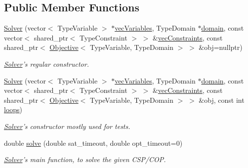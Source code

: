 \subsection*{Public Member Functions}
\begin{DoxyCompactItemize}
\item 
\hyperlink{classghost_1_1Solver_aee74bbdf00494dc209d4909bf9fcb544}{Solver} (vector$<$ Type\-Variable $>$ $\ast$\hyperlink{classghost_1_1Solver_a2d033a454234b2277aabdcc4d89eaba2}{vec\-Variables}, Type\-Domain $\ast$\hyperlink{classghost_1_1Solver_ad9292e9219261ba8058fec05b453c0c9}{domain}, const vector$<$ shared\-\_\-ptr$<$ Type\-Constraint $>$ $>$ \&\hyperlink{classghost_1_1Solver_a170746edcfb777b12978444c2ab3962e}{vec\-Constraints}, const shared\-\_\-ptr$<$ \hyperlink{classghost_1_1Objective}{Objective}$<$ Type\-Variable, Type\-Domain $>$ $>$ \&obj=nullptr)
\begin{DoxyCompactList}\small\item\em \hyperlink{classghost_1_1Solver}{Solver}'s regular constructor. \end{DoxyCompactList}\item 
\hyperlink{classghost_1_1Solver_a512335329b22a91700bdfa7870f053e9}{Solver} (vector$<$ Type\-Variable $>$ $\ast$\hyperlink{classghost_1_1Solver_a2d033a454234b2277aabdcc4d89eaba2}{vec\-Variables}, Type\-Domain $\ast$\hyperlink{classghost_1_1Solver_ad9292e9219261ba8058fec05b453c0c9}{domain}, const vector$<$ shared\-\_\-ptr$<$ Type\-Constraint $>$ $>$ \&\hyperlink{classghost_1_1Solver_a170746edcfb777b12978444c2ab3962e}{vec\-Constraints}, const shared\-\_\-ptr$<$ \hyperlink{classghost_1_1Objective}{Objective}$<$ Type\-Variable, Type\-Domain $>$ $>$ \&obj, const int \hyperlink{classghost_1_1Solver_aa6a77e14862a9be467e6c6c76124b526}{loops})
\begin{DoxyCompactList}\small\item\em \hyperlink{classghost_1_1Solver}{Solver}'s constructor mostly used for tests. \end{DoxyCompactList}\item 
double \hyperlink{classghost_1_1Solver_a5d15e316f5a4bb8a33c6781058ad0307}{solve} (double sat\-\_\-timeout, double opt\-\_\-timeout=0)
\begin{DoxyCompactList}\small\item\em \hyperlink{classghost_1_1Solver}{Solver}'s main function, to solve the given C\-S\-P/\-C\-O\-P. \end{DoxyCompactList}\end{DoxyCompactItemize}
